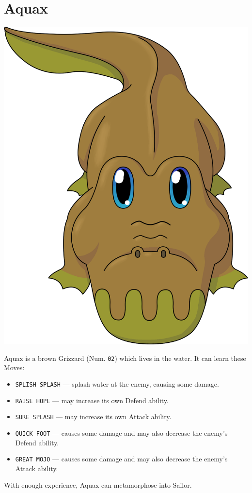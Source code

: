 \documentclass[9pt,twocolumn,openany,article]{memoir}
\newenvironment{ritemize}{\begin{itemize}\raggedright}{\end{itemize}}
\begin{document}
\fi

\section{Aquax}

\begin{center}
  \includegraphics[width=.7\columnwidth]{../Manual/Aquax.png}
\end{center}


\noindent{}Aquax is a  brown Grizzard (Num. \texttt{02})  which lives in
the water. It can learn these Moves:

\begin{ritemize}
\item  \texttt{SPLISH SPLASH}  --- splash  water at  the enemy,  causing
  some damage. 
\item \texttt{RAISE HOPE} --- may increase its own Defend ability.
\item \texttt{SURE SPLASH} --- may increase its own Attack ability.
\item \texttt{QUICK FOOT}  --- causes some damage and  may also decrease
  the enemy's Defend ability.
\item \texttt{GREAT MOJO}  --- causes some damage and  may also decrease
  the enemy's Attack ability.
\end{ritemize}

With enough experience, Aquax can metamorphose into Sailor.
\end{document}
